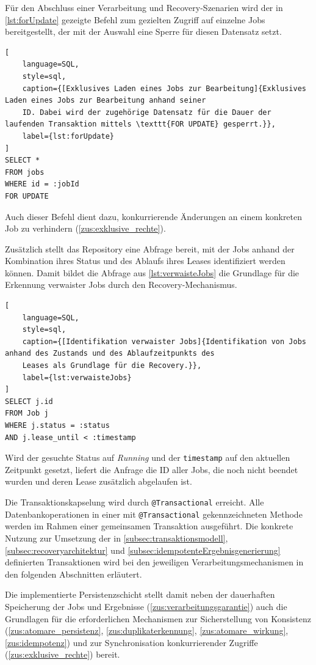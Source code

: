 Für den Abschluss einer Verarbeitung und Recovery-Szenarien wird der in \cref{lst:forUpdate} gezeigte Befehl
zum gezielten Zugriff auf einzelne Jobs bereitgestellt, der mit der Auswahl eine Sperre für diesen Datensatz setzt.

\begin{lstlisting}[
    language=SQL,
    style=sql,
    caption={[Exklusives Laden eines Jobs zur Bearbeitung]{Exklusives Laden eines Jobs zur Bearbeitung anhand seiner
    ID. Dabei wird der zugehörige Datensatz für die Dauer der laufenden Transaktion mittels \texttt{FOR UPDATE} gesperrt.}},
    label={lst:forUpdate}
]
SELECT *
FROM jobs
WHERE id = :jobId
FOR UPDATE
\end{lstlisting}

Auch dieser Befehl dient dazu, konkurrierende Änderungen an einem konkreten Job zu verhindern (\ref{zus:exklusive_rechte}).

Zusätzlich stellt das Repository eine Abfrage bereit, mit der Jobs anhand der Kombination ihres Status und des Ablaufs ihres Leases
identifiziert werden können.
Damit bildet die Abfrage aus \cref{lst:verwaisteJobs} die Grundlage für die Erkennung verwaister Jobs durch den Recovery-Mechanismus.

\begin{lstlisting}[
    language=SQL,
    style=sql,
    caption={[Identifikation verwaister Jobs]{Identifikation von Jobs anhand des Zustands und des Ablaufzeitpunkts des
    Leases als Grundlage für die Recovery.}},
    label={lst:verwaisteJobs}
]
SELECT j.id
FROM Job j
WHERE j.status = :status
AND j.lease_until < :timestamp
\end{lstlisting}

Wird der gesuchte Status auf \textit{Running} und der \texttt{timestamp} auf den aktuellen Zeitpunkt gesetzt, liefert
die Anfrage die ID aller Jobs, die noch nicht beendet wurden und deren Lease zusätzlich abgelaufen ist.

Die Transaktionskapselung wird durch \texttt{@Transactional} erreicht.
Alle Datenbankoperationen in einer mit \texttt{@Transactional} gekennzeichneten Methode werden im Rahmen einer
gemeinsamen Transaktion ausgeführt.
Die konkrete Nutzung zur Umsetzung der in \cref{subsec:transaktionsmodell}, \cref{subsec:recoveryarchitektur} und
\cref{subsec:idempotenteErgebnisgenerierung} definierten Transaktionen wird bei den jeweiligen
Verarbeitungsmechanismen in den folgenden Abschnitten erläutert.

Die implementierte Persistenzschicht stellt damit neben der dauerhaften Speicherung der Jobs und Ergebnisse
(\ref{zus:verarbeitungsgarantie}) auch die Grundlagen für die erforderlichen Mechanismen zur Sicherstellung von Konsistenz
(\ref{zus:atomare_persistenz}, \ref{zus:duplikaterkennung}, \ref{zus:atomare_wirkung}, \ref{zus:idempotenz})
und zur Synchronisation konkurrierender Zugriffe (\ref{zus:exklusive_rechte}) bereit.

